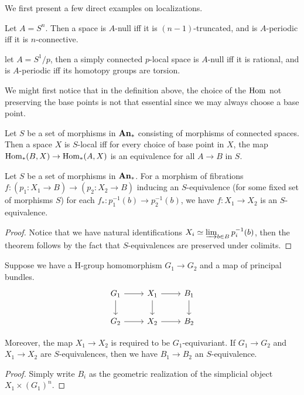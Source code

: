 	We first present a few direct examples on localizations. 

	\begin{exam}\label{Loc_exam}
		Let $A=S^n$. Then a space is $A$-null iff it is $(n-1)$-truncated, and is $A$-periodic iff it is $n$-connective. 

		let $A=S^1/p$, then a simply connected $p$-local space is $A$-null iff it is rational, and is $A$-periodic iff its homotopy groups are torsion. 
	\end{exam}

	We might first notice that in the definition above, the choice of the $\operatorname{\mathrm{Hom}}$ not preserving the base points is not that essential since we may always choose a base point. 
	
	\begin{lemma}\label{Basept_lemma}
		Let $S$ be a set of morphisms in $\mathbf{An}_*$ consisting of morphisms of connected spaces. Then a space $X$ is $S$-local iff for every choice of base point in $X$, the map $\operatorname{\mathrm{Hom}}_*(B,X)\to\operatorname{\mathrm{Hom}}_*(A,X)$ is an equivalence for all $A\to B$ in $S$. 
	\end{lemma}

	\begin{lemma}\label{Fibration_lemma}
		Let $S$ be a set of morphisms in $\mathbf{An}_*$. For a morphism of fibrations $f:(p_1:X_1\to B)\to(p_2:X_2\to B)$ inducing an $S$-equivalence (for some fixed set of morphisms $S$) for each $f_*:p_1^{-1}(b)\to p_2^{-1}(b)$, we have $f:X_1\to X_2$ is an $S$-equivalence. 
	\end{lemma}
	\begin{proof}
		Notice that we have natural identifications $X_i\simeq\varinjlim_{b\in B}p_i^{-1}(b)$, then the theorem follows by the fact that $S$-equivalences are preserved under colimits. 
	\end{proof}

	\begin{lemma}\label{Quotient_lemma}
		Suppose we have a H-group homomorphism $G_1\to G_2$ and a map of principal bundles. 
		\[\begin{tikzcd}
			{G_1} & {X_1} & {B_1} \\
			{G_2} & {X_2} & {B_2}
			\arrow[from=1-1, to=1-2]
			\arrow[from=1-1, to=2-1]
			\arrow[from=1-2, to=1-3]
			\arrow[from=1-2, to=2-2]
			\arrow[from=1-3, to=2-3]
			\arrow[from=2-1, to=2-2]
			\arrow[from=2-2, to=2-3]
		\end{tikzcd}\]

		Moreover, the map $X_1\to X_2$ is required to be $G_1$-equivariant. If $G_1\to G_2$ and $X_1\to X_2$ are $S$-equivalences, then we have $B_1\to B_2$ an $S$-equivalence. 
	\end{lemma}
	\begin{proof}
		Simply write $B_i$ as the geometric realization of the simplicial object $X_1\times(G_1)^n$. 
	\end{proof}


